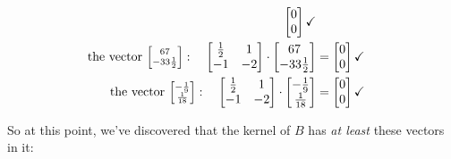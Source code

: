 \begin{align*}
\begin{bmatrix}
0 \\ 0 \\
\end{bmatrix}
\checkmark \\
\textrm{the vector }
{\scriptsize
\begin{bmatrix}
67 \\ -33\frac{1}{2} \\
\end{bmatrix}}: \quad
\begin{bmatrix}
\frac{1}{2} & 1 \\
-1 & -2 \\
\end{bmatrix} \cdot
\begin{bmatrix}
67 \\ -33\frac{1}{2} \\
\end{bmatrix} &=
\begin{bmatrix}
0 \\ 0 \\
\end{bmatrix}
\checkmark \\
\textrm{the vector }
{\scriptsize
\begin{bmatrix}
-\frac{1}{9} \\ \frac{1}{18} \\
\end{bmatrix}}: \quad
\begin{bmatrix}
\frac{1}{2} & 1 \\
-1 & -2 \\
\end{bmatrix} \cdot
\begin{bmatrix}
-\frac{1}{9} \\ \frac{1}{18} \\
\end{bmatrix} &=
\begin{bmatrix}
0 \\ 0 \\
\end{bmatrix}
\checkmark \\
\end{align*}
\normalsize
\vspace{-.15in}

So at this point, we've discovered that the kernel of $B$ has \textit{at least}
these vectors in it:

